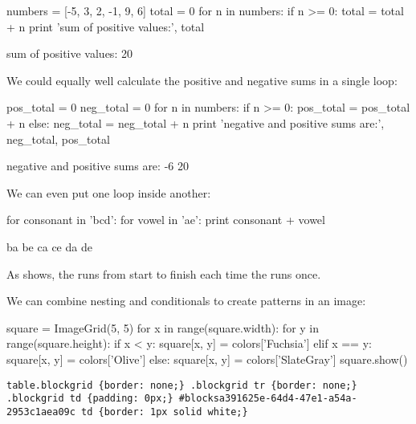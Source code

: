 \documentclass{book}
\begin{document}
\begin{VerbIn}
numbers = [-5, 3, 2, -1, 9, 6]
total = 0
for n in numbers:
    if n >= 0:
        total = total + n
print 'sum of positive values:', total
\end{VerbIn}

\begin{VerbOut}
sum of positive values: 20
\end{VerbOut}

We could equally well calculate the positive and negative sums in a
single loop:

\begin{VerbIn}
pos_total = 0
neg_total = 0
for n in numbers:
    if n >= 0:
        pos_total = pos_total + n
    else:
        neg_total = neg_total + n
print 'negative and positive sums are:', neg_total, pos_total
\end{VerbIn}

\begin{VerbOut}
negative and positive sums are: -6 20
\end{VerbOut}

We can even put one loop inside another:

\begin{VerbIn}
for consonant in 'bcd':
    for vowel in 'ae':
        print consonant + vowel
\end{VerbIn}

\begin{VerbOut}
ba
be
ca
ce
da
de
\end{VerbOut}

As  shows, the  runs
from start to finish each time the 
runs once.


We can combine nesting and conditionals to create patterns in an image:

\begin{VerbIn}
square = ImageGrid(5, 5)
for x in range(square.width):
    for y in range(square.height):
        if x < y:
            square[x, y] = colors['Fuchsia']
        elif x == y:
            square[x, y] = colors['Olive']
        else:
            square[x, y] = colors['SlateGray']
square.show()
\end{VerbIn}

\begin{Verbatim}
table.blockgrid {border: none;} .blockgrid tr {border: none;} .blockgrid td {padding: 0px;} #blocksa391625e-64d4-47e1-a54a-2953c1aea09c td {border: 1px solid white;}
\end{Verbatim}
\end{document}
